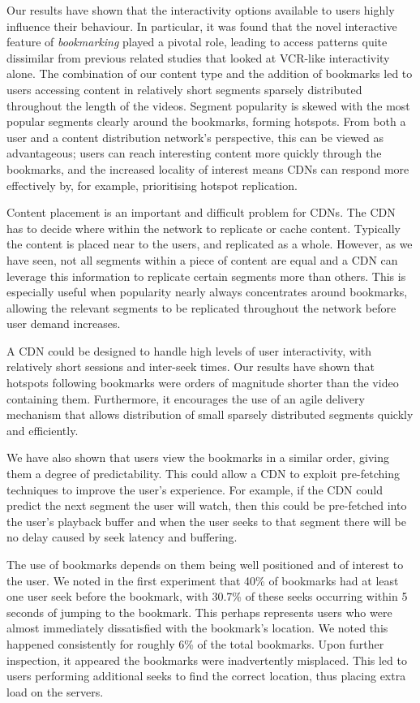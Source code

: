 Our results have shown that the interactivity options available to users highly influence their behaviour. In particular, it was found that the novel interactive feature of \emph{bookmarking} played a pivotal role, leading to access patterns quite dissimilar from previous related studies that looked at VCR-like interactivity alone.
The combination of our content type and the addition of bookmarks led to users accessing content in relatively short segments sparsely distributed throughout the length of the videos. Segment popularity is skewed with the most popular segments clearly around the bookmarks, forming hotspots. From both a user and a content distribution network's perspective, this can be viewed as advantageous; users can reach interesting content more quickly through the bookmarks, and the increased locality of interest means CDNs can respond more effectively by, for example, prioritising hotspot replication.

Content placement is an important and difficult problem for CDNs. The CDN has to decide where within the network to replicate or cache content. Typically the content is placed near to the users, and replicated as a whole. However, as we have seen, not all segments within a piece of content are equal and a CDN can leverage this information to replicate certain segments more than others. This is especially useful when popularity nearly always concentrates around bookmarks, allowing the relevant segments to be replicated throughout the network before user demand increases.

A CDN could be designed to handle high levels of user interactivity, with relatively short sessions and inter-seek times. Our results have shown that hotspots following bookmarks were orders of magnitude shorter than the video containing them. Furthermore, it encourages the use of an agile delivery mechanism that allows distribution of small sparsely distributed segments quickly and efficiently.

We have also shown that users view the bookmarks in a similar order, giving them a degree of predictability. This could allow a CDN to exploit pre-fetching techniques to improve the user's experience. For example, if the CDN could predict the next segment the user will watch, then this could be pre-fetched into the user's playback buffer and when the user seeks to that segment there will be no delay caused by seek latency and buffering.

The use of bookmarks depends on them being well positioned and of interest to the user. We noted in the first experiment that 40\% of bookmarks had at least one user seek before the bookmark, with 30.7\% of these seeks occurring within 5 seconds of jumping to the bookmark. This perhaps represents users who were almost immediately dissatisfied with the bookmark's location. We noted this happened consistently for roughly 6\% of the total bookmarks. Upon further inspection, it appeared the bookmarks were inadvertently misplaced. This led to users performing additional seeks to find the correct location, thus placing extra load on the servers.

